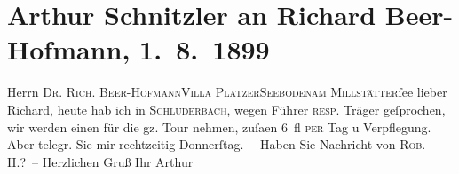 

         
         \renewcommand{\erwaehntePersonen}{Personen: Richard Beer-Hofmann, Robert Hirschfeld}
         \renewcommand{\erwaehnteOrte}{Orte: Carbonin, Millstätter See, Seeboden, Toblach, Villa Platzer}
         \renewcommand{\erwaehnteWerke}{}
               \section[Arthur Schnitzler an Richard Beer-Hofmann, 1. 8. 1899]{ Arthur Schnitzler an Richard Beer-Hofmann, 1. 8. 1899}\nopagebreak{}\rehead{ }\begin{ledgroupsized}[t]{13cm}\normalsize\beginnumbering \toendnotes[C]{\smallbreak\pagebreak[2]} 
\pstart{}{\pb}Herrn \textsc{Dr. Rich.
                     Beer-Hofmann}\pend{}\pstart{}\textsc{Villa Platzer}\pend{}\pstart{}\textsc{Seeboden}\pend{}\pstart{}\textsc{am
                     Millstätter}ſee\pend{}{\bigskip}\pstart
           \noindent{}{\pb}lieber Richard, heute hab ich in
                  \textsc{Schluderbac\textcolor{gray}{h}}, wegen
               Führer \textsc{resp.} Träger geſprochen, wir werden einen für die
               gz. Tour nehmen, zuſa{\geminationm}en 6 fl \textsc{per} Tag u Verpflegung. Aber telegr. Sie mir rechtzeitig Donnerſtag. –
               Haben Sie Nachricht von \textsc{Rob.
                     H.}? –\pend
           \pstart Herzlichen Gruß Ihr \spacefill\mbox{Arthur}\pend{}
         
         \endnumbering{}\end{ledgroupsized}  \newcommand{\dateiname}{L00956}\newcommand{\titel}{Arthur Schnitzler an Richard Beer-Hofmann, 1. 8. 1899}\newcommand{\editorInnen}{Martin Anton Müller und Gerd-Hermann Susen}
      